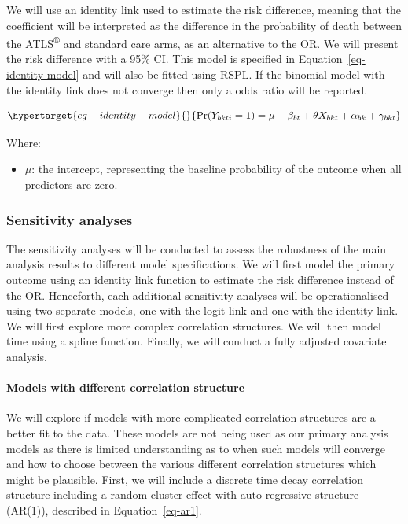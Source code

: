 \documentclass[
]{scrartcl}
\let\oldparagraph\paragraph
\renewcommand{\paragraph}[1]{\oldparagraph{#1}\mbox{}}
\providecommand{\tightlist}{%
  \setlength{\itemsep}{0pt}\setlength{\parskip}{0pt}}\usepackage{longtable,booktabs,array}
\begin{document}
We will use an identity link used to estimate the risk difference,
meaning that the coefficient will be interpreted as the difference in
the probability of death between the ATLS\textsuperscript{®} and
standard care arms, as an alternative to the OR. We will present the
risk difference with a 95\% CI. This model is specified in
Equation~\ref{eq-identity-model} and will also be fitted using RSPL. If
the binomial model with the identity link does not converge then only a
odds ratio will be reported.

\begin{equation}\protect\hypertarget{eq-identity-model}{}{
\text{Pr}(Y_{bkti} = 1) = \mu + \beta_{bt} + \theta X_{bkt} + \alpha_{bk} + \gamma_{bkt} 
}\label{eq-identity-model}\end{equation}

Where:

\begin{itemize}
\tightlist
\item
  \(\mu\): the intercept, representing the baseline probability of the
  outcome when all predictors are zero.
\end{itemize}

\hypertarget{sensitivity-analyses}{%
\subsubsection{Sensitivity analyses}\label{sensitivity-analyses}}

The sensitivity analyses will be conducted to assess the robustness of
the main analysis results to different model specifications. We will
first model the primary outcome using an identity link function to
estimate the risk difference instead of the OR. Henceforth, each
additional sensitivity analyses will be operationalised using two
separate models, one with the logit link and one with the identity link.
We will first explore more complex correlation structures. We will then
model time using a spline function. Finally, we will conduct a fully
adjusted covariate analysis.

\hypertarget{models-with-different-correlation-structure}{%
\paragraph{Models with different correlation
structure}\label{models-with-different-correlation-structure}}

We will explore if models with more complicated correlation structures
are a better fit to the data. These models are not being used as our
primary analysis models as there is limited understanding as to when
such models will converge and how to choose between the various
different correlation structures which might be plausible. First, we
will include a discrete time decay correlation structure including a
random cluster effect with auto-regressive structure (AR(1)), described
in Equation~\ref{eq-ar1}.
\end{document}
